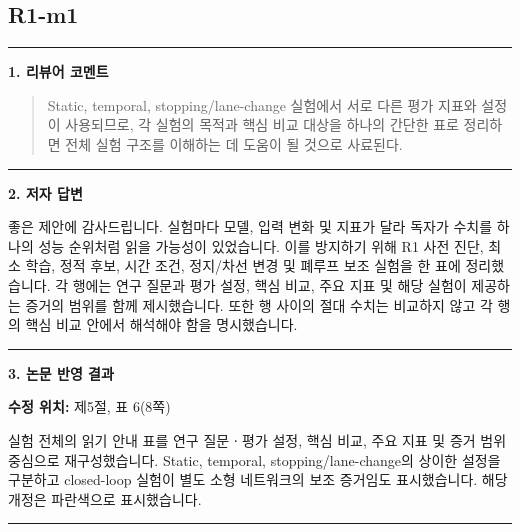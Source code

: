 \documentclass[11pt]{article}
\newcommand{\fieldheading}[2]{%
  \par\medskip\noindent
  {\color{#1}\rule{3pt}{1.25em}}\hspace{0.55em}\textbf{#2}\par\smallskip}
\newenvironment{reviewitem}[1]
  {\subsection*{#1}}
  {\par\medskip\hrule\bigskip}
\newenvironment{reviewercomment}
  {\fieldheading{reviewercolor}{1. 리뷰어 코멘트}%
   \begin{quote}}
  {\end{quote}}
\newenvironment{authorresponse}
  {\fieldheading{responsecolor}{2. 저자 답변}}
  {\par}
\newenvironment{manuscriptrevision}[1]
  {\fieldheading{revisioncolor}{3. 논문 반영 결과}%
   \textbf{수정 위치:} #1\par\smallskip}
  {\par}
\begin{document}
\begin{reviewitem}{R1-m1}
  \begin{reviewercomment}
    Static, temporal, stopping/lane-change 실험에서 서로 다른 평가 지표와 설정이
    사용되므로, 각 실험의 목적과 핵심 비교 대상을 하나의 간단한 표로 정리하면
    전체 실험 구조를 이해하는 데 도움이 될 것으로 사료된다.
  \end{reviewercomment}

  \begin{authorresponse}
    좋은 제안에 감사드립니다. 실험마다 모델, 입력 변화 및 지표가 달라 독자가
    수치를 하나의 성능 순위처럼 읽을 가능성이 있었습니다. 이를 방지하기 위해
    R1 사전 진단, 최소 학습, 정적 후보, 시간 조건, 정지/차선 변경 및 폐루프 보조
    실험을 한 표에 정리했습니다. 각 행에는 연구 질문과 평가 설정, 핵심 비교,
    주요 지표 및 해당 실험이 제공하는 증거의 범위를 함께 제시했습니다. 또한
    행 사이의 절대 수치는 비교하지 않고 각 행의 핵심 비교 안에서 해석해야 함을
    명시했습니다.
  \end{authorresponse}

  \begin{manuscriptrevision}{제5절, 표 6(8쪽)}
    실험 전체의 읽기 안내 표를 연구 질문ㆍ평가 설정, 핵심 비교, 주요 지표 및
    증거 범위 중심으로 재구성했습니다. Static, temporal, stopping/lane-change의
    상이한 설정을 구분하고 closed-loop 실험이 별도 소형 네트워크의 보조 증거임도
    표시했습니다. 해당 개정은 파란색으로 표시했습니다.
  \end{manuscriptrevision}
\end{reviewitem}
\end{document}
